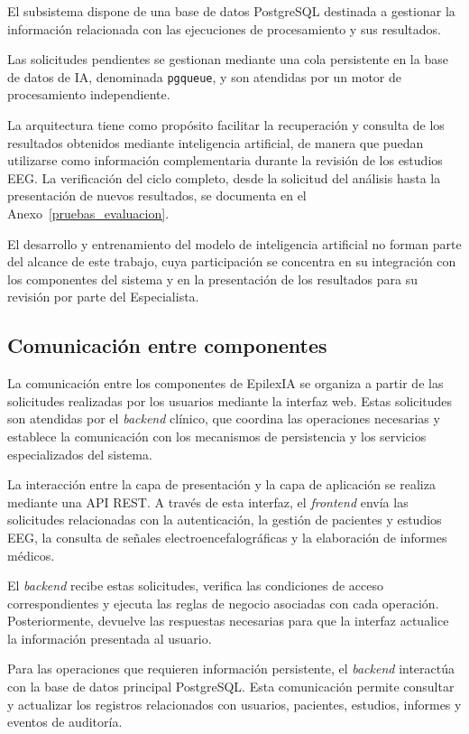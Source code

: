 El subsistema dispone de una base de datos
PostgreSQL destinada a gestionar la información
relacionada con las ejecuciones de procesamiento
y sus resultados.

Las solicitudes pendientes se gestionan mediante una cola persistente en la base de datos de IA, denominada \texttt{pgqueue}, y son atendidas por un motor de procesamiento independiente.


La arquitectura tiene como propósito facilitar la recuperación y consulta de los resultados obtenidos mediante inteligencia artificial, de manera que puedan utilizarse como información complementaria durante la revisión de los estudios EEG.  La verificación del ciclo completo, desde la solicitud del análisis hasta la presentación de nuevos resultados, se documenta en el Anexo~\ref{pruebas_evaluacion}.


El desarrollo y entrenamiento del modelo de
inteligencia artificial no forman parte del alcance
de este trabajo, cuya participación
se concentra en su integración con los componentes
del sistema y en la presentación de los resultados
para su revisión por parte del Especialista.


\subsection{Comunicación entre componentes}
\label{subsec:comunicacion-componentes}

La comunicación entre los componentes de EpilexIA se
organiza a partir de las solicitudes realizadas por
los usuarios mediante la interfaz web. Estas solicitudes
son atendidas por el \textit{backend} clínico, que coordina
las operaciones necesarias y establece la comunicación
con los mecanismos de persistencia y los servicios
especializados del sistema.

La interacción entre la capa de presentación y la
capa de aplicación se realiza mediante una API REST.
A través de esta interfaz, el \textit{frontend} envía las
solicitudes relacionadas con la autenticación,
la gestión de pacientes y estudios EEG, la consulta
de señales electroencefalográficas y la elaboración
de informes médicos.

El \textit{backend} recibe estas solicitudes, verifica las
condiciones de acceso correspondientes y ejecuta
las reglas de negocio asociadas con cada operación.
Posteriormente, devuelve las respuestas necesarias
para que la interfaz actualice la información
presentada al usuario.

Para las operaciones que requieren información
persistente, el \textit{backend} interactúa con la base
de datos principal PostgreSQL. Esta comunicación
permite consultar y actualizar los registros
relacionados con usuarios, pacientes, estudios,
informes y eventos de auditoría.

